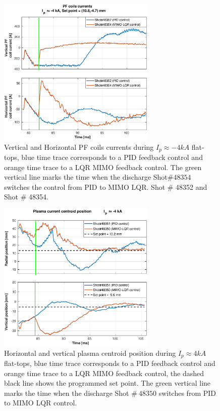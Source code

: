 \begin{figure}
	\centering
	\includegraphics[width=0.67\textwidth]{Chp5/PIDvsMIMO_352_354_curr_2.eps}
	\caption{ Vertical and Horizontal PF coils currents during  $I_p\approx -4kA$  flat-tops, blue time trace corresponds to a PID feedback control and orange time trace to a LQR MIMO feedback control. The green vertical line marks the time  when the  discharge Shot$\# 48354$ switches the control from PID to MIMO LQR. Shot $\#$ 48352 and Shot $\#$ 48354.}
\end{figure}


\begin{figure}
	\centering
	\includegraphics[width=0.67\textwidth]{Chp5/PIDvsMIMO_351_350_2.eps}
	\caption{Horizontal and vertical plasma centroid position during  $I_p\approx 4kA$  flat-tops, blue time trace corresponds to a PID feedback control and orange time trace to a LQR MIMO feedback control, the dashed black line shows the programmed set point. The green vertical line marks the time  when the  discharge Shot $\# ~48350$ switches  from PID to MIMO LQR control.}
\end{figure}

